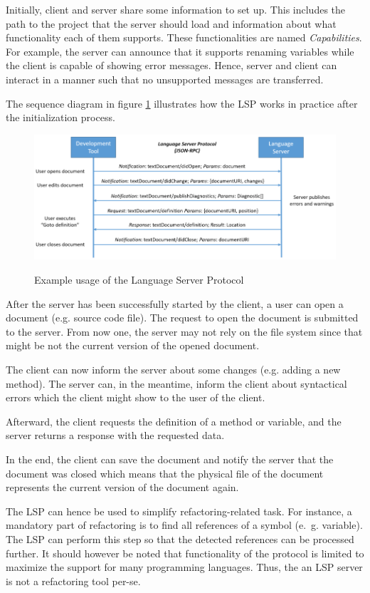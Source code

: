 Initially, client and server share some information to set up. This includes the path to the project that the server should load and information about what functionality each of them supports. These functionalities are named \textit{Capabilities}. For example, the server can announce that it supports renaming variables while the client is capable of showing error messages. Hence, server and client can interact in a manner such that no unsupported messages are transferred.

The sequence diagram in figure \ref{fig:lsp_usage} illustrates how the \ac{LSP} works in practice after the initialization process. 
\begin{figure}
    \centering
    \includegraphics{figures/chapter2/language-server-sequence.png}
    \caption{Example usage of the Language Server Protocol}
    \label{fig:lsp_usage}
    \cite{lsp_website}
\end{figure}

After the server has been successfully started by the client, a user can open a document (e.g. source code file). The request to open the document is submitted to the server. From now one, the server may not rely on the file system since that might be not the current version of the opened document. 

The client can now inform the server about some changes (e.g. adding a new method). The server can, in the meantime, inform the client about syntactical errors which the client might show to the user of the client.

Afterward, the client requests the definition of a method or variable, and the server returns a response with the requested data.

In the end, the client can save the document and notify the server that the document was closed which means that the physical file of the document represents the current version of the document again. 

The \ac{LSP} can hence be used to simplify refactoring-related task. For instance, a mandatory part of refactoring is to find all references of a symbol (e.~g. variable). The \ac{LSP} can perform this step so that the detected references can be processed further. It should however be noted that functionality of the protocol is limited to maximize the support for many programming languages. Thus, the an \ac{LSP} server is not a refactoring tool per-se. 

